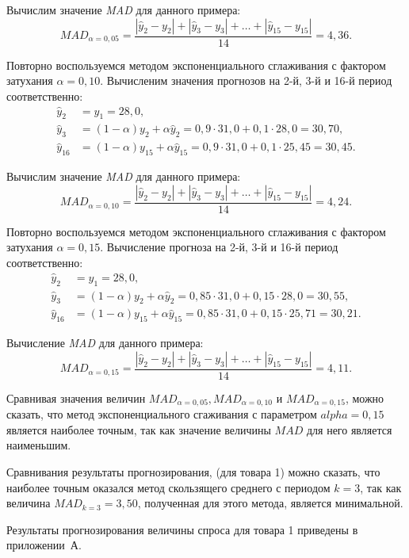 Вычислим значение \textit{MAD} для данного примера:
\[
  MAD_{\alpha = 0{,}05} = \dfrac{|\hat{y}_2 - y_2| + |\hat{y}_3 - y_3| + \dots + |\hat{y}_{15} - y_{15}|}{14} = 4{,}36.
\]

Повторно воспользуемся методом экспоненциального сглаживания с фактором
затухания $\alpha=0{,}10$. Вычисленим значения прогнозов на 2-й, 3-й и 16-й период соответственно:
\begin{align*}
  \hat{y}_2 &= y_1 = 28{,}0, \\
  \hat{y}_3 &= (1 - \alpha) y_2 + \alpha \hat{y}_2 = 0{,}9 \cdot 31{,}0 + 0{,}1 \cdot 28{,}0 = 30{,}70, \\
  \hat{y}_{16} &= (1 - \alpha) y_{15} + \alpha \hat{y}_{15}  = 0{,}9 \cdot 31{,}0 + 0{,}1 \cdot 25{,}45 = 30{,}45.
\end{align*}

Вычислим значение \textit{MAD} для данного примера:
\[
  MAD_{\alpha = 0{,}10} = \dfrac{|\hat{y}_2 - y_2| + |\hat{y}_3 - y_3| + \dots + |\hat{y}_{15} - y_{15}|}{14} = 4{,}24.
\]

Повторно воспользуемся методом экспоненциального сглаживания с фактором
затухания $\alpha=0{,}15$. Вычисление прогноза на 2-й, 3-й и 16-й период соответственно:
\begin{align*}
  \hat{y}_2 &= y_1 = 28{,}0, \\
  \hat{y}_3 &= (1 - \alpha) y_2 + \alpha \hat{y}_2 = 0{,}85 \cdot 31{,}0 + 0{,}15 \cdot 28{,}0 = 30{,}55, \\
  \hat{y}_{16} &= (1 - \alpha) y_{15} + \alpha \hat{y}_{15}  = 0{,}85 \cdot 31{,}0 + 0{,}15 \cdot 25{,}71 = 30{,}21.
\end{align*}

Вычисление \textit{MAD} для данного примера:
\[
  MAD_{\alpha = 0{,}15} = \dfrac{|\hat{y}_2 - y_2| + |\hat{y}_3 - y_3| + \dots + |\hat{y}_{15} - y_{15}|}{14} = 4{,}11.
\]

Сравнивая значения величин $MAD_{\alpha = 0{,}05}, MAD_{\alpha = 0{,}10}$ и $MAD_{\alpha = 0{,}15}$,
можно сказать, что метод экспоненциального сгаживания с параметром $alpha = 0{,}15$
является наиболее точным, так как значение величины $MAD$ для него является наименьшим.

Сравнивания результаты прогнозирования, (для товара 1) можно сказать, что наиболее точным
оказался метод скользящего среднего с периодом $k = 3$, так как величина
$ MAD_{k=3} = 3{,}50$, полученная для этого метода, является минимальной.

Результаты прогнозирования величины спроса для товара 1 приведены в приложении~А.



